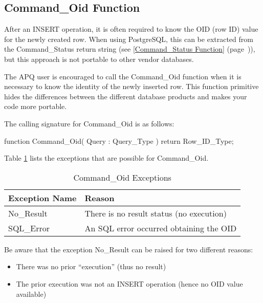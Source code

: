 \documentclass[english,letterpaper]{book}
\newcommand\Ref[1]{\textsection\ref{#1} (page~\pageref{#1})}
\begin{document}
\subsection{Command\_Oid Function \label{Command_Oid Function}}

After an INSERT operation, it is often required to know the OID (row ID)
value for the newly created row. When using PostgreSQL, this can be
extracted from the Command\_Status return string (see
\Ref{Command_Status Function}), but this approach is not
portable to other vendor databases.

The APQ user is encouraged to call the Command\_Oid function when
it is necessary to know the identity of the newly inserted row. This
function primitive hides the differences between the different database
products and makes your code more portable.

The calling signature for Command\_Oid is as follows:

\begin{Code}
function Command_Oid(
   Query : Query_Type
) return Row_ID_Type;
\end{Code}

Table \ref{t:coidx} lists the exceptions that are possible for Command\_Oid.

\begin{table}
   \begin{center}
      \begin{tabular}{ll}
         Exception Name    &  Reason\\
         \hline 
         No\_Result        &  There is no result status (no execution)\\
         SQL\_Error        &  An SQL error occurred obtaining the OID\\
      \end{tabular}
   \end{center}
   \caption{Command\_Oid Exceptions}\label{t:coidx}
\end{table}

Be aware that the exception No\_Result can be raised for two different
reasons:

\begin{itemize}
   \item There was no prior ``execution'' (thus no result)
   \item The prior execution was not an INSERT operation (hence no OID value available)
\end{itemize}
\end{document}
